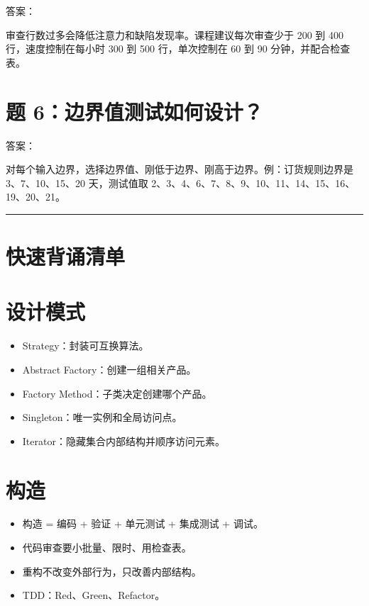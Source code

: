 \documentclass[UTF8,zihao=-4]{ctexart}
\begin{document}
答案：

审查行数过多会降低注意力和缺陷发现率。课程建议每次审查少于 200 到 400 行，速度控制在每小时 300 到 500 行，单次控制在 60 到 90 分钟，并配合检查表。

\section{题 6：边界值测试如何设计？}

答案：

对每个输入边界，选择边界值、刚低于边界、刚高于边界。例：订货规则边界是 3、7、10、15、20 天，测试值取 2、3、4、6、7、8、9、10、11、14、15、16、19、20、21。

\bigskip\hrule\bigskip

\section{快速背诵清单}

\section{设计模式}

\begin{itemize}
\item Strategy：封装可互换算法。
\item Abstract Factory：创建一组相关产品。
\item Factory Method：子类决定创建哪个产品。
\item Singleton：唯一实例和全局访问点。
\item Iterator：隐藏集合内部结构并顺序访问元素。
\end{itemize}

\section{构造}

\begin{itemize}
\item 构造 = 编码 + 验证 + 单元测试 + 集成测试 + 调试。
\item 代码审查要小批量、限时、用检查表。
\item 重构不改变外部行为，只改善内部结构。
\item TDD：Red、Green、Refactor。
\end{itemize}
\end{document}
